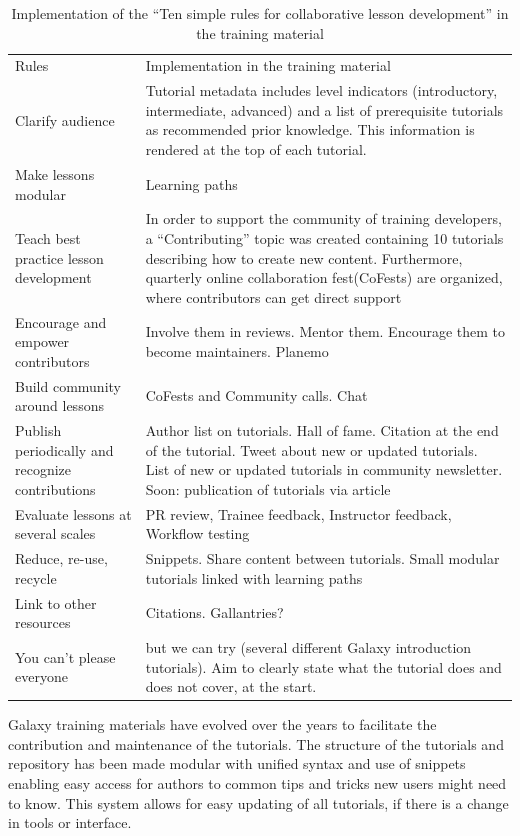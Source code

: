 \documentclass[10pt,letterpaper]{article}
\begin{document}
\begin{table}[]
	\centering
	\caption{Implementation of the ``Ten simple rules for collaborative lesson development''\cite{Devenyi_2018} in the training material
    \label{tbl:tensimplerules}}
	\begin{tabular}{p{}p{}}
		Rules & Implementation in the training material \\
		Clarify audience & Tutorial metadata includes level indicators (introductory, intermediate, advanced) and a list of prerequisite tutorials as recommended prior knowledge. This information is rendered at the top of each tutorial. \\
		Make lessons modular & Learning paths \\
		Teach best practice lesson development & In order to support the community of training developers, a ``Contributing'' topic was created containing 10 tutorials describing how to create new content. Furthermore, quarterly online collaboration fest(CoFests) are organized, where contributors can get direct support  \\
		Encourage and empower contributors & Involve them in reviews. Mentor them. Encourage them to become maintainers. Planemo \\
		Build community around lessons & CoFests and Community calls. Chat \\
		Publish periodically and recognize contributions & Author list on tutorials. Hall of fame. Citation at the end of the tutorial. Tweet about new or updated tutorials. List of new or updated tutorials in community newsletter. Soon: publication of tutorials via article \\
		Evaluate lessons at several scales & PR review, Trainee feedback, Instructor feedback, Workflow testing \\
		Reduce, re-use, recycle & Snippets. Share content between tutorials. Small modular tutorials linked with learning paths \\
		Link to other resources & Citations. Gallantries? \\
		You can't please everyone & but we can try (several different Galaxy introduction tutorials). Aim to clearly state what the tutorial does and does not cover, at the start.  \\
	\end{tabular}
\end{table}


Galaxy training materials have evolved over the years to facilitate the contribution and maintenance of the tutorials.
The structure of the tutorials and repository has been made modular with unified syntax and use of snippets enabling easy access for authors to common tips and tricks new users might need to know.
This system allows for easy updating of all tutorials, if there is a change in tools or interface.
\end{document}
